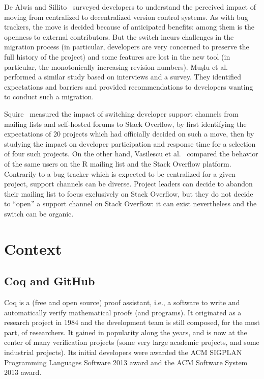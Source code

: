 \documentclass[conference]{IEEEtran}
\begin{document}
De Alwis and Sillito~\cite{de2009software} surveyed developers to understand the perceived impact of moving from centralized to decentralized version control systems. As with bug trackers, the move is decided because of anticipated benefits: among them is the openness to external contributors. But the switch incurs challenges in the migration process (in particular, developers are very concerned to preserve the full history of the project) and some features are lost in the new tool (in particular, the monotonically increasing revision numbers).
Muşlu et al.~\cite{mucslu2014transition} performed a similar study based on interviews and a survey. They identified expectations and barriers and provided recommendations to developers wanting to conduct such a migration.

Squire~\cite{squire2015should} measured the impact of switching developer support channels from mailing lists and self-hosted forums to Stack Overflow, by first identifying the expectations of 20 projects which had officially decided on such a move, then by studying the impact on developer participation and response time for a selection of four such projects. On the other hand, Vasilescu et al.~\cite{vasilescu2014social} compared the behavior of the same users on the R mailing list and the Stack Overflow platform. Contrarily to a bug tracker which is expected to be centralized for a given project, support channels can be diverse. Project leaders can decide to abandon their mailing list to focus exclusively on Stack Overflow, but they do not decide to ``open'' a support channel on Stack Overflow: it can exist nevertheless and the switch can be organic.


\section{Context}

\label{context}

\subsection{Coq and GitHub}
Coq is a (free and open source) proof assistant, i.e., a software to write and automatically verify mathematical proofs (and programs). It originated as a research project in 1984 and the development team is still composed, for the most part, of researchers. It gained in popularity along the years, and is now at the center of many verification projects (some very large academic projects, and some industrial projects). Its initial developers were awarded  the ACM SIGPLAN Programming Languages Software 2013 award and the ACM Software System 2013 award.
\end{document}
